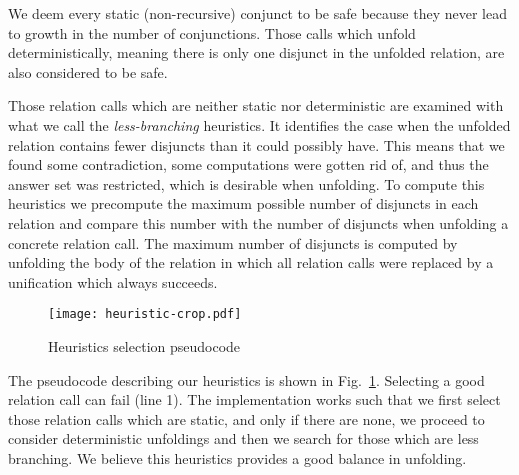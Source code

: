 We deem every static (non-recursive) conjunct to be safe because they never lead to growth in the number of conjunctions.
Those calls which unfold deterministically, meaning there is only one disjunct in the unfolded relation, are also considered to be safe.

Those relation calls which are neither static nor deterministic are examined with what we call the \emph{less-branching} heuristics.
It identifies the case when the unfolded relation contains fewer disjuncts than it could possibly have.
This means that we found some contradiction, some computations were gotten rid of, and thus the answer set was restricted, which is desirable when unfolding.
To compute this heuristics we precompute the maximum possible number of disjuncts in each relation and compare this number with the number of disjuncts when unfolding a concrete relation call.
The maximum number of disjuncts is computed by unfolding the body of the relation in which all relation calls were replaced by a unification which always succeeds.

\begin{figure}[!t]
  \centering
  \texttt{[image: heuristic-crop.pdf]}
  \caption{Heuristics selection pseudocode}
  \label{fig:heu-pseudo}
\end{figure}


The pseudocode describing our heuristics is shown in Fig.~\ref{fig:heu-pseudo}.
Selecting a good relation call can fail (line 1).
The implementation works such that we first select those relation calls which are static, and only if there are none, we proceed to consider deterministic unfoldings and then we search for those which are less branching.
We believe this heuristics provides a good balance in unfolding.



